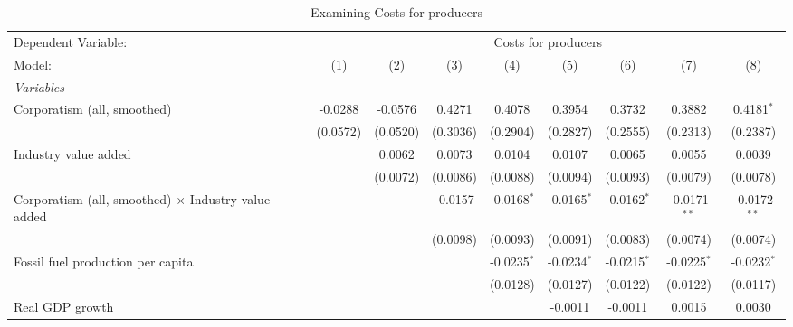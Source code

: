
\begin{table}[htbp]
   \caption{Examining Costs for producers}
   \centering
   \begin{tabular}{lcccccccc}
      \tabularnewline \midrule \midrule
      Dependent Variable: & \multicolumn{8}{c}{Costs for producers}\\
      Model:                                                     & (1)      & (2)      & (3)      & (4)           & (5)           & (6)           & (7)            & (8)\\  
      \midrule
      \emph{Variables}\\
      Corporatism (all, smoothed)                                & -0.0288  & -0.0576  & 0.4271   & 0.4078        & 0.3954        & 0.3732        & 0.3882         & 0.4181$^{*}$\\   
                                                                 & (0.0572) & (0.0520) & (0.3036) & (0.2904)      & (0.2827)      & (0.2555)      & (0.2313)       & (0.2387)\\   
      Industry value added                                       &          & 0.0062   & 0.0073   & 0.0104        & 0.0107        & 0.0065        & 0.0055         & 0.0039\\   
                                                                 &          & (0.0072) & (0.0086) & (0.0088)      & (0.0094)      & (0.0093)      & (0.0079)       & (0.0078)\\   
      Corporatism (all, smoothed) $\times$ Industry value added  &          &          & -0.0157  & -0.0168$^{*}$ & -0.0165$^{*}$ & -0.0162$^{*}$ & -0.0171$^{**}$ & -0.0172$^{**}$\\   
                                                                 &          &          & (0.0098) & (0.0093)      & (0.0091)      & (0.0083)      & (0.0074)       & (0.0074)\\   
      Fossil fuel production per capita                          &          &          &          & -0.0235$^{*}$ & -0.0234$^{*}$ & -0.0215$^{*}$ & -0.0225$^{*}$  & -0.0232$^{*}$\\   
                                                                 &          &          &          & (0.0128)      & (0.0127)      & (0.0122)      & (0.0122)       & (0.0117)\\   
      Real GDP growth                                            &          &          &          &               & -0.0011       & -0.0011       & 0.0015         & 0.0030\\   

\end{tabular}
\end{table}
